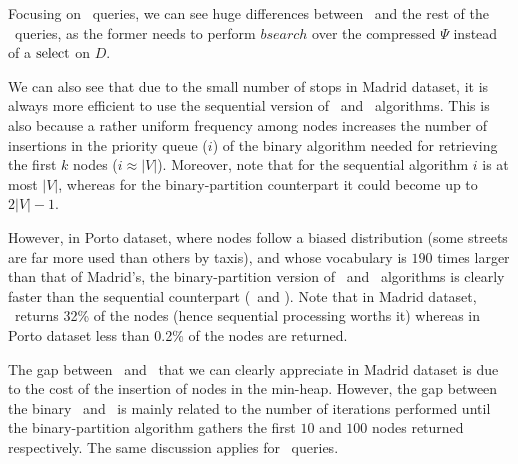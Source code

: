 

	Focusing on \Stk\ queries, we can see huge differences between \Stks\  
	and the rest of the \Stk\ queries, as the former needs to perform {$ bsearch$} over the compressed $\Psi$
	instead of a $\operatorname{select}$ on $D$. 

	We can also see that due to the small number of stops in Madrid dataset, it is always more efficient 
	to use the sequential version of \Stks\ and \Stk\ algorithms. This is also because a rather uniform frequency among nodes 
	increases the number of insertions in the priority queue ($i$) of the binary algorithm
	needed for retrieving the first $k$ nodes ($i \approx |V|$). Moreover, note that for the sequential algorithm 
	$i$ is  at most $|V|$, whereas for the binary-partition counterpart it could become up to $2|V|-1$.


	However, in Porto dataset, where nodes follow a biased distribution (some streets are far more used than others
	by taxis), and whose vocabulary 
	is $190$ times larger than that of Madrid's, the binary-partition version of \Stks\ and \Stk\ algorithms is clearly
	faster than the sequential counterpart (\Stkseq\ and \Stksseq).
	Note that in Madrid dataset, \Stcien\ returns 32\% of the nodes (hence sequential processing worths it) 
	whereas in Porto dataset less than 0.2\% of the nodes are returned. 

	The gap between \Stdiezseq\ and \Stcienseq\ that we can clearly appreciate in Madrid dataset 
	is due to the cost of the insertion of nodes in the min-heap. However, the gap between 
	the binary \Stdiez\ and \Stcien\ 
	is mainly related to the number of iterations performed until the binary-partition algorithm gathers the first
	$10$ and $100$ {nodes}  returned respectively. The same discussion applies for \Stks\ queries.






